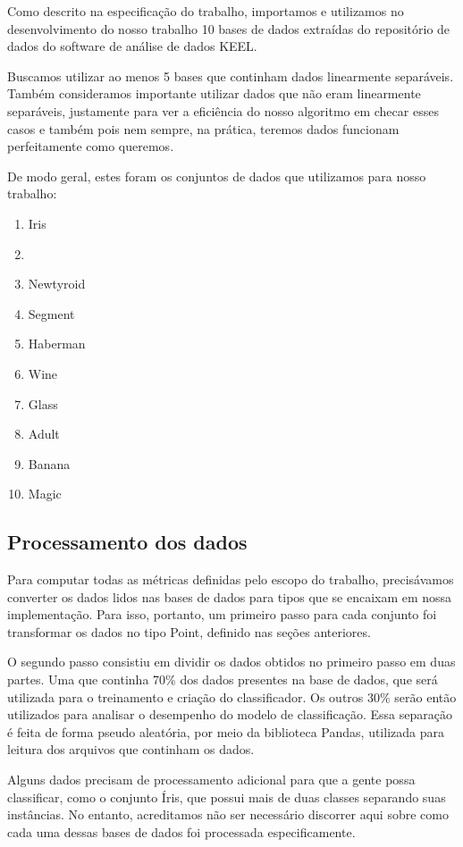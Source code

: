 \documentclass{article}
\begin{document}
Como descrito na especificação do trabalho, importamos e utilizamos no desenvolvimento do nosso trabalho 10 bases de dados extraídas do repositório de dados do software de análise de dados KEEL.

Buscamos utilizar ao menos 5 bases que continham dados linearmente separáveis. Também consideramos importante utilizar dados que não eram linearmente separáveis, justamente para ver a eficiência do nosso algoritmo em checar esses casos e também pois nem sempre, na prática, teremos dados funcionam perfeitamente como queremos.

De modo geral, estes foram os conjuntos de dados que utilizamos para nosso trabalho:

\begin{enumerate}
	\item Iris
	\item
	\item Newtyroid
	\item Segment
	\item Haberman
	\item Wine
	\item Glass
	\item Adult
	\item Banana
	\item Magic

\end{enumerate}

\subsection{Processamento dos dados}

Para computar todas as métricas definidas pelo escopo do trabalho, precisávamos converter os dados lidos nas bases de dados para tipos que se encaixam em nossa implementação. Para isso, portanto, um primeiro passo para cada conjunto foi transformar os dados no tipo Point, definido nas seções anteriores.

O segundo passo consistiu em dividir os dados obtidos no primeiro passo em duas partes. Uma que continha 70\% dos dados presentes na base de dados, que será utilizada para o treinamento e criação do classificador. Os outros 30\% serão então utilizados para analisar o desempenho do modelo de classificação. Essa separação é feita de forma pseudo aleatória, por meio da biblioteca Pandas, utilizada para leitura dos arquivos que continham os dados.

Alguns dados precisam de processamento adicional para que a gente possa classificar, como o conjunto Íris, que possui mais de duas classes separando suas instâncias. No entanto, acreditamos não ser necessário discorrer aqui sobre como cada uma dessas bases de dados foi processada especificamente.
\end{document}
